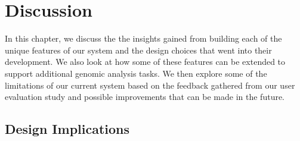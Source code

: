 \chapter{Discussion}

In this chapter, we discuss the the insights gained from building each of the unique features of our system and the design choices that went into their development. We also look at how some of these features can be extended to support additional genomic analysis tasks. We then explore some of the limitations of our current system based on the feedback gathered from our user evaluation study and possible improvements that can be made in the future.

 \section{Design Implications}
 

